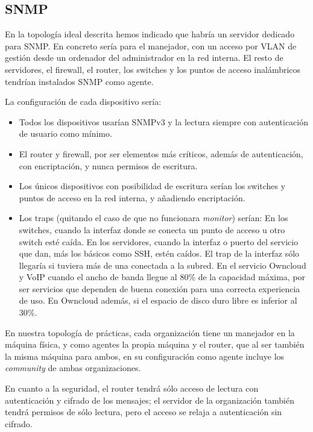 \documentclass[]{article}
\begin{document}
\subsection{SNMP}

En la topología ideal descrita hemos indicado que habría un servidor dedicado para SNMP. En concreto sería para el manejador, con un acceso por VLAN de gestión desde un ordenador del administrador en la red interna. El resto de servidores, el firewall, el router, los switches y los puntos de acceso inalámbricos tendrían instalados SNMP como agente.

La configuración de cada dispositivo sería:
\begin{itemize}
	\item Todos los dispositivos usarían SNMPv3 y la lectura siempre con autenticación de usuario como mínimo.
	\item El router y firewall, por ser elementos más críticos, además de autenticación, con encriptación, y nunca permisos de escritura.
	\item Los únicos dispositivos con posibilidad de escritura serían los switches y puntos de acceso en la red interna, y añadiendo encriptación.
	\item Los traps (quitando el caso de que no funcionara \textit{monitor}) serían:
		\subitem En los switches, cuando la interfaz donde se conecta un punto de acceso u otro switch esté caída.
		\subitem En los servidores, cuando la interfaz o puerto del servicio que dan, más los básicos como SSH, estén caídos. El trap de la interfaz sólo llegaría si tuviera más de una conectada a la subred.
		\subsubitem En el servicio Owncloud y VoIP cuando el ancho de banda llegue al 80\% de la capacidad máxima, por ser servicios que dependen de buena conexión para una correcta experiencia de uso.
		\subsubitem En Owncloud además, si el espacio de disco duro libre es inferior al 30\%.
\end{itemize}

\hfill

En nuestra topología de prácticas, cada organización tiene un manejador en la máquina física, y como agentes la propia máquina y el router, que al ser también la misma máquina para ambos, en su configuración como agente incluye los \textit{community} de ambas organizaciones.

En cuanto a la seguridad, el router tendrá sólo acceso de lectura con autenticación y cifrado de los mensajes; el servidor de la organización también tendrá permisos de sólo lectura, pero el acceso se relaja a autenticación sin cifrado.
\end{document}
